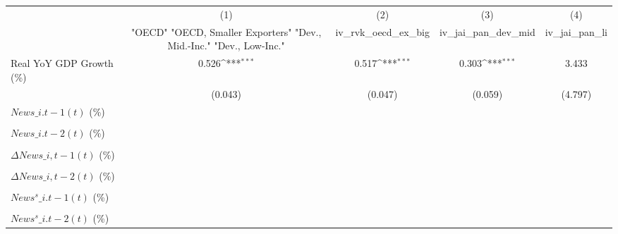 {
\def\sym#1{\ifmmode^{#1}\else\(^{#1}\)\fi}
\begin{tabular}{l*{4}{c}}
\toprule
                    &\multicolumn{1}{c}{(1)}&\multicolumn{1}{c}{(2)}&\multicolumn{1}{c}{(3)}&\multicolumn{1}{c}{(4)}\\
                    &\multicolumn{1}{c}{ "OECD" "OECD, Smaller Exporters" "Dev., Mid.-Inc." "Dev., Low-Inc."}&\multicolumn{1}{c}{iv\_rvk\_oecd\_ex\_big}&\multicolumn{1}{c}{iv\_jai\_pan\_dev\_mid}&\multicolumn{1}{c}{iv\_jai\_pan\_li}\\
\midrule
Real YoY GDP Growth (\%)&       0.526\sym{***}&       0.517\sym{***}&       0.303\sym{***}&       3.433         \\
                    &     (0.043)         &     (0.047)         &     (0.059)         &     (4.797)         \\
\addlinespace
$ News\_{i.t-1}(t)$ (\%)&                     &                     &                     &                     \\
                    &                     &                     &                     &                     \\
\addlinespace
$ News\_{i.t-2}(t)$ (\%)&                     &                     &                     &                     \\
                    &                     &                     &                     &                     \\
\addlinespace
$ \Delta News\_{i,t-1}(t)$ (\%)&                     &                     &                     &                     \\
                    &                     &                     &                     &                     \\
\addlinespace
$ \Delta News\_{i,t-2}(t)$ (\%)&                     &                     &                     &                     \\
                    &                     &                     &                     &                     \\
\addlinespace
$ News^s\_{i.t-1}(t)$ (\%)&                     &                     &                     &                     \\
                    &                     &                     &                     &                     \\
\addlinespace
$ News^s\_{i.t-2}(t)$ (\%)&                     &                     &                     &                     \\

\end{tabular}}
